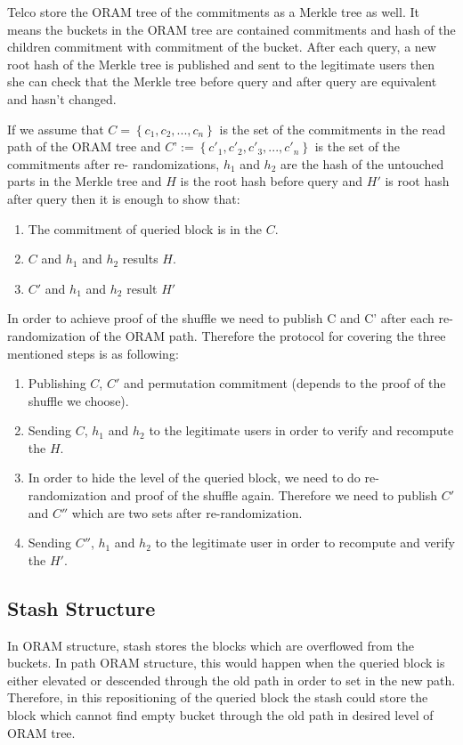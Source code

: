 \documentclass[12pt]{article}
\begin{document}
Telco store the ORAM tree of the commitments as a Merkle tree as well. It means the buckets in the ORAM tree are contained commitments and hash of the children commitment with commitment of the bucket.  After each query, a new root hash of the Merkle tree is published and sent to the legitimate users then she can check that the Merkle tree before query and after query are equivalent and hasn’t changed.

If we assume that $C=\left\{c_1,c_2,...,c_n\right\}$ is the set of the commitments in the read path of the ORAM tree and $C’:=\left\{ c'_1,c'_2,c'_3,...,c'_n\right\}$ is the set of the commitments after re- randomizations, $h_1$ and $h_2$ are the hash of the untouched parts in the Merkle tree and $H$ is the root hash before query and $H'$ is root hash after query  then it is enough to show that:
\begin{enumerate}
\item The commitment of queried block is in the $C$.
\item $C$ and $h_1$ and $h_2$ results $H$.
\item $C'$ and $h_1$ and $h_2$ result $H'$

\end{enumerate}
In order to achieve proof of the shuffle we need to publish C and C’ after each re-randomization of the ORAM path. Therefore the protocol for covering the three mentioned steps is as following:
\begin{enumerate}
\item 	Publishing $C$, $C'$ and permutation commitment (depends to the proof of the shuffle we choose).
\item	Sending $C$, $h_1$ and $h_2$ to the legitimate users in order to verify and recompute the $H$.
\item	In order to hide the level of the queried block, we need to do re-randomization and proof of the shuffle again. Therefore we need to publish $C'$and $C''$ which are two sets after re-randomization.
\item	Sending $C''$, $h_1$ and $h_2$ to the legitimate user in order to recompute and verify the $H'$. 


\end{enumerate}

\subsection{Stash Structure}
In ORAM structure, stash stores the blocks which are overflowed from the buckets. In path ORAM structure, this would happen when the queried block is either elevated or descended through the old path in order to set in the new path. Therefore, in this repositioning of the queried block the stash could store the block which cannot find empty bucket through the old path in desired level of ORAM tree. 
\end{document}
